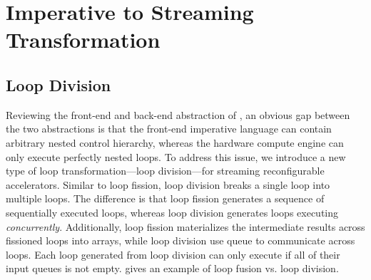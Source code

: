 \section{Imperative to Streaming Transformation}
\label{sec:control}



\subsection{Loop Division}
Reviewing the front-end and back-end abstraction of \name, an obvious gap between the two
abstractions is that the front-end imperative language can contain arbitrary nested control hierarchy, whereas
the hardware compute engine can only execute perfectly nested loops.
To address this issue, we introduce a new type of loop transformation---loop division---for streaming reconfigurable
accelerators.
Similar to loop fission, loop division breaks a single loop into multiple loops.
The difference is that loop fission generates a sequence of sequentially executed loops, whereas
loop division generates loops executing \emph{concurrently}.
Additionally, loop fission materializes the intermediate results across fissioned loops into arrays,
while loop division use queue to communicate across loops.
Each loop generated from loop division can only execute if all of their input queues is not empty.
 gives an example of loop fusion vs. loop division.

